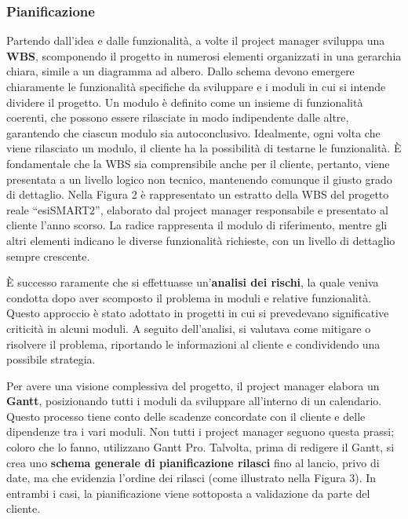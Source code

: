         \subsubsection{Pianificazione}
        Partendo dall’idea e dalle funzionalità, a volte il project manager sviluppa una \textbf{\ac{WBS}}, scomponendo il progetto in
        numerosi elementi organizzati in una gerarchia chiara, simile a un diagramma ad albero. Dallo schema devono emergere chiaramente le
        funzionalità specifiche da sviluppare e i moduli in cui si intende dividere il progetto. Un modulo è definito come un insieme di funzionalità
        coerenti, che possono essere rilasciate in modo indipendente dalle altre, garantendo che ciascun modulo sia autoconclusivo. Idealmente, ogni
        volta che viene rilasciato un modulo, il cliente ha la possibilità di testarne le funzionalità. È fondamentale che la \ac{WBS} sia comprensibile
        anche per il cliente, pertanto, viene presentata a un livello logico non tecnico, mantenendo comunque il giusto grado di dettaglio.
        Nella Figura 2 è rappresentato un estratto della \ac{WBS} del progetto reale “esiSMART2”, elaborato dal project manager responsabile e
        presentato al cliente l'anno scorso. La radice rappresenta il modulo di riferimento, mentre gli altri elementi indicano le diverse
        funzionalità richieste, con un livello di dettaglio sempre crescente.


        È successo raramente che si effettuasse un'\textbf{analisi dei rischi}, la quale veniva condotta dopo aver scomposto il problema in moduli
        e relative funzionalità. Questo approccio è stato adottato in progetti in cui si prevedevano significative criticità in alcuni moduli.
        A seguito dell'analisi, si valutava come mitigare o risolvere il problema, riportando le informazioni al cliente e condividendo una possibile strategia.

        Per avere una visione complessiva del progetto, il project manager elabora un \textbf{Gantt}, posizionando tutti i moduli da sviluppare all'interno di un
        calendario. Questo processo tiene conto delle scadenze concordate con il cliente e delle dipendenze tra i vari moduli. Non tutti i project manager
        seguono questa prassi; coloro che lo fanno, utilizzano Gantt Pro. Talvolta, prima di redigere il Gantt, si crea uno \textbf{schema generale di pianificazione
        rilasci} fino al lancio, privo di date, ma che evidenzia l’ordine dei rilasci (come illustrato nella Figura 3). In entrambi i casi, la pianificazione
        viene sottoposta a validazione da parte del cliente.

